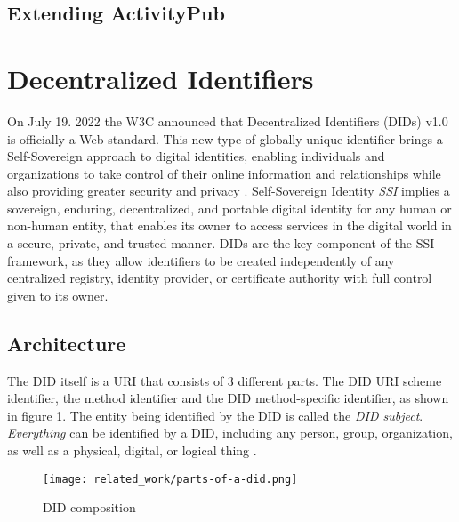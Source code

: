 \subsection{Extending ActivityPub}\label{sec:extending_activitypub}

\section{Decentralized Identifiers} \label{section:dids}

On July 19. 2022 the W3C announced that Decentralized Identifiers (DIDs) v1.0 is officially a Web standard. This new type of globally unique identifier brings a Self-Sovereign approach to digital identities, enabling individuals and organizations to take control of their online information and relationships while also providing greater security and privacy \cite{w3c_2022}. Self-Sovereign Identity \emph{SSI} implies a sovereign, enduring, decentralized, and portable digital identity for any human or non-human entity, that enables its owner to access services in the digital world in a secure, private, and trusted manner. DIDs are the key component of the SSI framework, as they allow identifiers to be created independently of any centralized registry, identity provider, or certificate authority with full control given to its owner\cite{Naik_Jenkins_2021}\cite{sporny_longley_sabadello_reed_steele_2021}.

\subsection{Architecture}

The DID itself is a URI that consists of 3 different parts. The DID URI scheme identifier, the method identifier and the DID method-specific identifier, as shown in figure \ref{fig:did}. The entity being identified by the DID is called the \emph{DID subject}. \emph{Everything} can be identified by a DID, including any person, group, organization, as well as a physical, digital, or logical thing \cite{Conway_Hughes_Ma_Poole_Riedel_2019}\cite{sporny_longley_sabadello_reed_steele_2021}.

\begin{figure}[h]
  \centering
  \texttt{[image: related\_work/parts-of-a-did.png]}
  \caption{DID composition \cite{sporny_longley_sabadello_reed_steele_2021}}
  \label{fig:did}
\end{figure}


